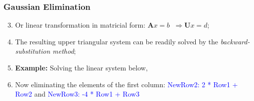 \documentclass[10pt,compress,handout,ignorenonframetext]{beamer}
\begin{document}
\begin{frame}
  \frametitle{Gaussian Elimination} 
  \begin{enumerate}
  \setcounter{enumi}{2}
     \item <1-> Or linear transformation in matricial form: $\bm{A}x=b\;\;\Longrightarrow \bm{U}x=d$;
     \item <2-> The resulting upper triangular system can be readily solved by the {\it backward-substitution method};
     \item <3-> {\bf Example:} Solving the linear system below,

     \item <4-> Now eliminating the elements of the first column: \textcolor{blue}{NewRow2: 2 * Row1 + Row2} and \textcolor{blue}{NewRow3: -4 * Row1 + Row3} 

  \end{enumerate}
\end{frame}
\end{document}
